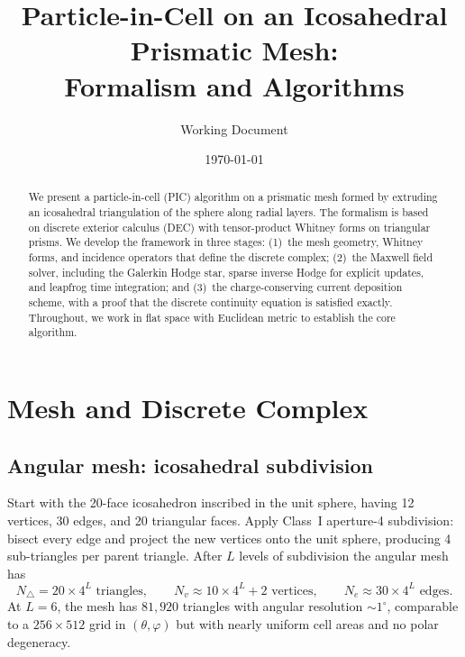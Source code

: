 \documentclass[11pt,a4paper]{article}
\title{Particle-in-Cell on an Icosahedral Prismatic Mesh:\\
  Formalism and Algorithms}
\author{Working Document}
\date{\today}
\begin{document}
\maketitle

\begin{abstract}
We present a particle-in-cell (PIC) algorithm on a prismatic mesh formed by
extruding an icosahedral triangulation of the sphere along radial layers. The
formalism is based on discrete exterior calculus (DEC) with tensor-product
Whitney forms on triangular prisms. We develop the framework in three stages:
(1)~the mesh geometry, Whitney forms, and incidence operators that define the
discrete complex; (2)~the Maxwell field solver, including the Galerkin Hodge
star, sparse inverse Hodge for explicit updates, and leapfrog time integration;
and (3)~the charge-conserving current deposition scheme, with a proof that
the discrete continuity equation is satisfied exactly. Throughout, we work in
flat space with Euclidean metric to establish the core algorithm.
\end{abstract}

\tableofcontents

\section{Mesh and Discrete Complex}
\label{sec:mesh}

\subsection{Angular mesh: icosahedral subdivision}

Start with the 20-face icosahedron inscribed in the unit sphere, having 12
vertices, 30 edges, and 20 triangular faces. Apply Class~I aperture-4
subdivision: bisect every edge and project the new vertices onto the unit
sphere, producing 4 sub-triangles per parent triangle. After $L$ levels of
subdivision the angular mesh has
\begin{equation}
  N_\triangle = 20 \times 4^L \text{ triangles}, \qquad
  N_v \approx 10 \times 4^L + 2 \text{ vertices}, \qquad
  N_e \approx 30 \times 4^L \text{ edges}.
\end{equation}
At $L = 6$, the mesh has $81{,}920$ triangles with angular resolution
$\sim 1^\circ$, comparable to a $256 \times 512$ grid in
$(\theta,\varphi)$ but with nearly uniform cell areas and no polar degeneracy.
\end{document}
